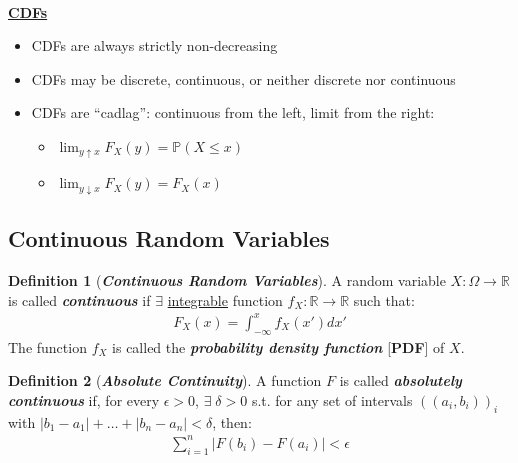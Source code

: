 \documentclass[12pt]{extarticle}
\newcommand{\pstart}[0]{\noindent}
\newcommand{\newp}[0]{~\\\pstart}
\newcommand{\term}[1]{\textbf{\textit{#1}}}
\newcommand{\titleul}[1]{\pstart\textbf{\ul{#1}}}
\theoremstyle{definition}
\newtheorem*{definition}{Definition}
\theoremstyle{remark}
\newcommand{\prob}[1]{\mathbb{P}\left(#1\right)}
\begin{document}
\newp
\titleul{CDFs}
\begin{itemize}
    \item CDFs are always strictly non-decreasing
    \item CDFs may be discrete, continuous, or neither discrete nor 
continuous
    \item CDFs are ``cadlag'': continuous from the left, limit from the 
right: \begin{itemize}
        \item $\lim_{y\uparrow x}F_X(y)=\prob{X\leq x}$
        \item $\lim_{y\downarrow x}F_X(y)=F_X(x)$
    \end{itemize}
\end{itemize}

\subsection{Continuous Random Variables}
\begin{tcolorbox}[colback=blue!50!green!15!white]
    \begin{definition}[\term{Continuous Random Variables}]
        A random variable $X:\Omega\to\mathbb{R}$ is called 
\term{continuous} if $\exists$ \ul{integrable} function 
$f_X:\mathbb{R}\to\mathbb{R}$ such that: \begin{align*}
            F_X(x)=\int_{-\infty}^xf_X(x')dx'
        \end{align*}
        The function $f_X$ is called the \term{probability density 
function} [\textbf{PDF}] of $X$.
    \end{definition}
\end{tcolorbox}

\begin{definition}[\term{Absolute Continuity}]
    A function $F$ is called \term{absolutely continuous} if, for every 
$\epsilon>0$, $\exists\;\delta>0$ s.t. for any set of intervals 
$((a_i,b_i))_i$ with $|b_1-a_1|+\hdots+|b_n-a_n|<\delta$, then: 
\begin{align*}
        \sum_{i=1}^n|F(b_i)-F(a_i)|<\epsilon
    \end{align*}
\end{definition}
\end{document}
